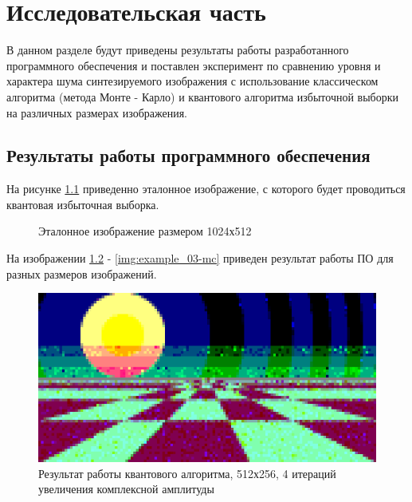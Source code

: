 \chapter{Исследовательская часть}

В данном разделе будут приведены результаты работы разработанного программного обеспечения и поставлен эксперимент по сравнению уровня и характера шума синтезируемого изображения с использование классическом алгоритма (метода Монте - Карло) и квантового алгоритма избыточной выборки на различных размерах изображения.

\section{Результаты работы программного обеспечения}

На рисунке \ref{img:reference} приведенно эталонное изображение, с которого будет проводиться квантовая избыточная выборка.

\begin{figure}[H]
	\begin{center}
	\end{center}
	\captionsetup{justification=centering}
	\caption{Эталонное изображение размером 1024х512}
	\label{img:reference}
\end{figure}

На изображении \ref{img:example_01} - \ref{img:example_03-mc} приведен результат работы ПО для разных размеров изображений. 

\begin{figure}[H]
	\begin{center}
		\includegraphics[scale=0.9]{img/prog_res/qss-512-4.png}
	\end{center}
	\captionsetup{justification=centering}
	\caption{Результат работы квантового алгоритма, 512х256, 4 итераций увеличения комплексной амплитуды}
	\label{img:example_01}
\end{figure}


